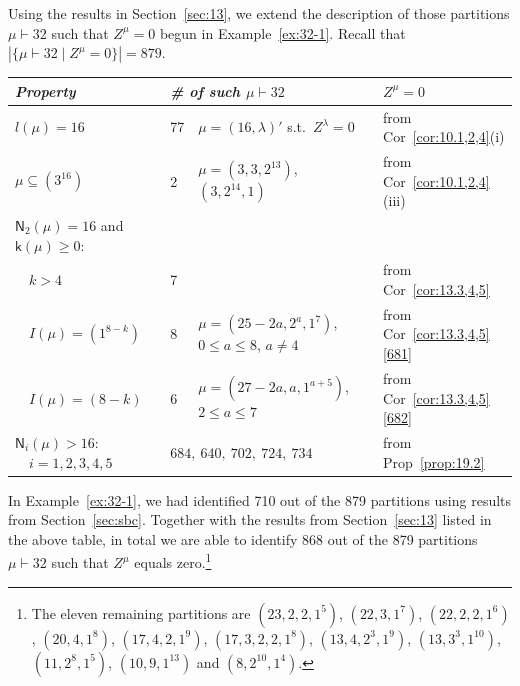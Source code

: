 \documentclass[ALCO, Unicode]{cedram}
\newcommand{\sk}{\mathsf{k}}
\newcommand{\sn}{\mathsf{N}}
\begin{document}
\begin{example}\label{ex:32-2}
	Using the results in Section~\ref{sec:13}, we extend the description of those partitions $\mu\vdash 32$ such that $Z^\mu=0$ begun in Example~\ref{ex:32-1}. Recall that $|\{\mu\vdash 32\mid Z^\mu=0\}|=879$. 
	
	\footnotesize
		\begin{tabular}{l|ll|l}
			\textit{Property} & \multicolumn{2}{l|}{\textit{\# of such $\mu\vdash 32$}} & \textit{$Z^\mu=0$} \\
			\hline
			$l(\mu)=16$ & 77 & $\mu=(16,\lambda)'$ s.t.~$Z^\lambda=0$ & from Cor~\ref{cor:10.1,2,4}(i)\\
			$\mu\subseteq(3^{16})$ & 2 & $\mu=(3,3,2^{13})$, $(3,2^{14},1)$ & from Cor~\ref{cor:10.1,2,4}(iii)\\
			$\sn_2(\mu)=16$ and $\sk(\mu)\ge 0$: & & &\\
			$\quad k>4$ & 7 & & from Cor~\ref{cor:13.3,4,5}\\
			$\quad I(\mu)=(1^{8-k})$ & 8 & $\mu=(25-2a,2^a,1^7)$, $0\le a\le 8$, $a\ne 4$ & from Cor~\ref{cor:13.3,4,5}\ref{681} \\
			$\quad I(\mu)=(8-k)$ & 6 & $\mu=(27-2a,a,1^{a+5})$, $2\le a\le 7$ & from Cor~\ref{cor:13.3,4,5}\ref{682} \\
			$\sn_i(\mu)>16$:$\quad i=1, 2, 3, 4, 5$ & \multicolumn{2}{l|}{$684,\ 640,\ 702,\ 724,\ 734\ $} & from Prop~\ref{prop:19.2}\\
		\end{tabular}
	\normalsize
	\smallskip
	
In Example~\ref{ex:32-1}, we had identified 710 out of the 879 partitions using results from Section~\ref{sec:sbc}.  
Together with the results from Section~\ref{sec:13} listed in the above table, in total we are able to identify 868 out of the 879 partitions $\mu\vdash 32$ such that $Z^\mu$ equals zero.\footnote{The eleven remaining partitions are $(23,2,2,1^5)$, $(22,3,1^7)$, $(22,2,2,1^6)$, $(20,4,1^8)$, $(17,4,2,1^9)$, $(17,3,2,2,1^8)$, $(13,4,2^3,1^9)$, $(13,3^3,1^{10})$, $(11,2^8,1^5)$, $(10,9,1^{13})$ and $(8,2^{10},1^4)$.} %
\end{example}
\end{document}
